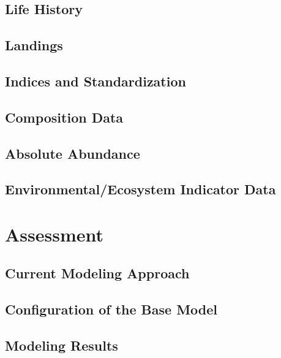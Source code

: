 \documentclass[
]{scrartcl}
\begin{document}
\subsection{Life History}\label{life-history}

\subsection{Landings}\label{landings}

\subsection{Indices and
Standardization}\label{indices-and-standardization}

\subsection{Composition Data}\label{composition-data}

\subsection{Absolute Abundance}\label{absolute-abundance}

\subsection{Environmental/Ecosystem Indicator
Data}\label{environmentalecosystem-indicator-data}

\newpage{}

\section{Assessment}\label{assessment}

\subsection{Current Modeling Approach}\label{current-modeling-approach}

\subsection{Configuration of the Base
Model}\label{configuration-of-the-base-model}

\newpage{}

\subsection{Modeling Results}\label{modeling-results}
\end{document}
